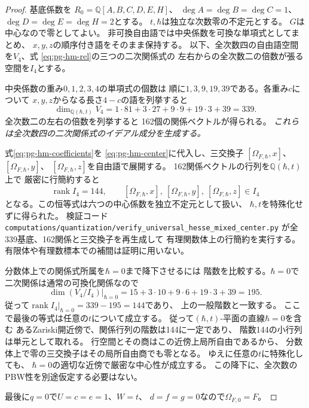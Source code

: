 \begin{proof}
基底係数を
$R_0=\mathbb Q[A,B,C,D,E,H]$、
$\deg A=\deg B=\deg C=1$、
$\deg D=\deg E=\deg H=2$とする。
$t,\hbar$は独立な次数零の不定元とする。
$G$は中心なので零としてよい。
非可換自由語では中央係数を可換な単項式としてまとめ、
$x,y,z$の順序付き語をそのまま保持する。
以下、全次数四の自由語空間を$V_4$、式
\eqref{eq:pg-hm-rel}の三つの二次関係式の
左右からの全次数二の倍数が張る空間を$I_4$とする。

中央係数の重み$0,1,2,3,4$の単項式の個数は
順に$1,3,9,19,39$である。各重み$c$について
$x,y,z$からなる長さ$4-c$の語を列挙すると
\begin{equation}
 \dim_{\mathbb Q(\hbar,t)}V_4
 =1\cdot81+3\cdot27+9\cdot9+19\cdot3+39=339.
\end{equation}
全次数二の左右の倍数を列挙すると
162個の関係ベクトルが得られる。
\emph{これらは全次数四の二次関係式のイデアル成分を生成する。}

式\eqref{eq:pg-hm-coefficients}を
\eqref{eq:pg-hm-center}に代入し、三交換子
$[\Omega_{F,\hbar},x]$、$[\Omega_{F,\hbar},y]$、
$[\Omega_{F,\hbar},z]$を自由語で展開する。
162関係ベクトルの行列を$\mathbb Q(\hbar,t)$上で
厳密に行簡約すると
\begin{equation}
 \operatorname{rank}I_4=144,\qquad
 [\Omega_{F,\hbar},x],\
 [\Omega_{F,\hbar},y],\
 [\Omega_{F,\hbar},z]\in I_4
 \label{eq:pg-hm-certificate}
\end{equation}
となる。この恒等式は六つの中心係数を独立不定元として扱い、
$\hbar,t$を特殊化せずに得られた。
検証コード
\texttt{computations/quantization/verify\_universal\_hesse\_mixed\_center.py}
が全339基底、162関係と三交換子を再生成して
有理関数体上の行簡約を実行する。
有限体や有理数標本での補間は証明に用いない。

分数体上での関係式所属を$\hbar=0$まで降下させるには
階数を比較する。$\hbar=0$で二次関係は通常の可換化関係なので
\begin{equation}
 \dim(V_4/I_4)|_{\hbar=0}
 =15+3\cdot10+9\cdot6+19\cdot3+39=195.
\end{equation}
従って$\operatorname{rank}I_4|_{\hbar=0}=339-195=144$であり、
上の一般階数と一致する。
ここで最後の等式は任意の$t$について成立する。
従って$(\hbar,t)$-平面の直線$\hbar=0$を含む
あるZariski開近傍で、関係行列の階数は144に一定であり、
階数144の小行列は単元として取れる。
行空間とその商はこの近傍上局所自由であるから、
分数体上で零の三交換子はその局所自由商でも零となる。
ゆえに任意の$t$に特殊化しても、
$\hbar=0$の適切な近傍で厳密な中心性が成立する。
この降下に、全次数のPBW性を別途仮定する必要はない。

最後に$q=0$で$U=c=e=1$、$W=t$、
$d=f=g=0$なので$\Omega_{F,0}=F$。
\end{proof}

